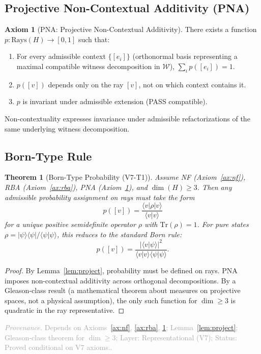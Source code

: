\documentclass[11pt,a4paper]{article}
\newtheorem{theorem}{Theorem}[section]
\theoremstyle{definition}
\newtheorem{axiom}{Axiom}
\theoremstyle{remark}
\newcommand{\assumptionfooter}[3]{%
  \par\smallskip\noindent\textcolor{darkgray}{\footnotesize\textit{Provenance.} Depends on #1; Layer: #2; Status: #3.}\par\medskip
}
\begin{document}
\subsection{Projective Non-Contextual Additivity (PNA)}

\begin{axiom}[PNA: Projective Non-Contextual Additivity]\label{ax:pna}
There exists a function $p \colon \mathrm{Rays}(H) \to [0,1]$ such that:
\begin{enumerate}[label=(\roman*)]
  \item For every admissible context $\{[e_i]\}$ (orthonormal basis representing a maximal compatible witness decomposition in $\mathcal{W}$), $\sum_i p([e_i]) = 1$.
  \item $p([v])$ depends only on the ray $[v]$, not on which context contains it.
  \item $p$ is invariant under admissible extension (PASS compatible).
\end{enumerate}
Non-contextuality expresses invariance under admissible refactorizations of the same underlying witness decomposition.
\end{axiom}

\subsection{Born-Type Rule}

\begin{theorem}[Born-Type Probability (V7-T1)]\label{thm:born}
Assume NF (Axiom~\ref{ax:nf}), RBA (Axiom~\ref{ax:rba}), PNA (Axiom~\ref{ax:pna}), and $\dim(H) \geq 3$. Then any admissible probability assignment on rays must take the form
\[
  p([v]) = \frac{\langle v | \rho | v \rangle}{\langle v | v \rangle}
\]
for a unique positive semidefinite operator $\rho$ with $\mathrm{Tr}(\rho) = 1$. For pure states $\rho = |\psi\rangle\langle\psi| / \langle\psi|\psi\rangle$, this reduces to the standard Born rule:
\[
  p([v]) = \frac{|\langle v | \psi \rangle|^2}{\langle v | v \rangle \langle \psi | \psi \rangle}.
\]
\end{theorem}
\begin{proof}
By Lemma~\ref{lem:project}, probability must be defined on rays. PNA imposes non-contextual additivity across orthogonal decompositions. By a Gleason-class result (a mathematical theorem about measures on projective spaces, not a physical assumption), the only such function for $\dim \geq 3$ is quadratic in the ray representative.
\end{proof}
\assumptionfooter{Axioms~\ref{ax:nf}, \ref{ax:rba}, \ref{ax:pna}; Lemma~\ref{lem:project}; Gleason-class theorem for $\dim \ge 3$}{Representational (V7)}{Proved conditional on V7 axioms.}
\end{document}
